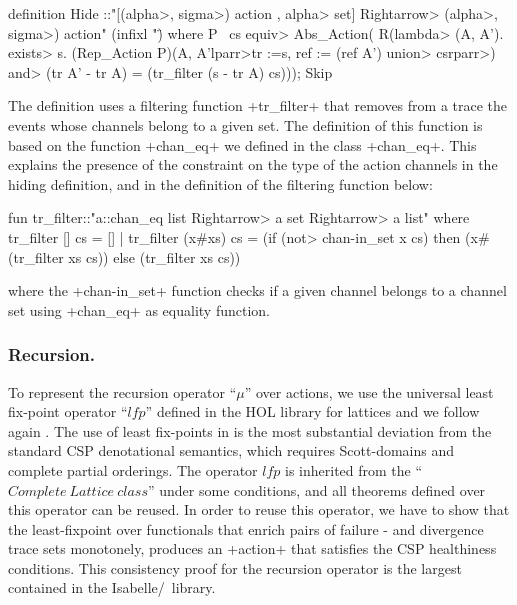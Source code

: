 \documentclass[11pt,a4paper]{article}
\begin{document}
\begin{isar}
definition
Hide ::"[(\<alpha>, \<sigma>) action , \<alpha>    set] \<Rightarrow> (\<alpha>, \<sigma>) action" (infixl "\")
where  
P \ cs \<equiv>  Abs_Action( R(\<lambda> (A, A'). 
           \<exists> s. (Rep_Action P)(A, A'\<lparr>tr :=s, ref := (ref A') \<union>       cs\<rparr>) 
               \<and> (tr A' - tr A) = (tr_filter (s - tr A) cs))); Skip
\end{isar}

The definition uses a filtering function \inlineisar+tr_filter+ that removes from a trace the events whose channels belong to a given set. The definition of this function is based on the function \inlineisar+chan_eq+ we defined in the class \inlineisar+chan_eq+. This explains the presence of the constraint on the type of the action channels in the hiding definition, and in the definition of the filtering function below:

\begin{isar}
fun tr_filter::"a::chan_eq list \<Rightarrow> a set \<Rightarrow> a list" where
  tr_filter [] cs = []
| tr_filter (x#xs) cs = (if (\<not> chan-in_set x cs) 
                              then (x#(tr_filter xs cs))
                                else (tr_filter xs cs))
\end{isar}

\noindent where the \inlineisar+chan-in_set+ function checks if a given channel belongs to a channel set using \inlineisar+chan_eq+ as equality function.


\subsubsection{Recursion.}
To represent the recursion operator ``$\mu$'' over actions, we use the universal least fix-point operator ``$lfp$'' defined in the HOL
library for lattices and we follow again \cite{CircusDS}. The use of least fix-points in \cite{CircusDS} is the most substantial 
deviation from the standard CSP denotational semantics, which requires Scott-domains and complete partial orderings.
The operator $lfp$ is inherited from the ``$Complete~Lattice~class$'' under some conditions, and all theorems defined over this operator can be reused. 
In order to reuse this operator, we have to show that the least-fixpoint over functionals that enrich pairs of failure - and
divergence trace sets monotonely, produces an \inlineisar+action+ that satisfies the CSP healthiness conditions.
This consistency proof for the recursion operator is the largest contained in the Isabelle/\Circus\ library.
\end{document}
